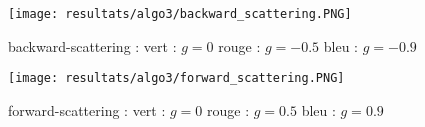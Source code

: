 \begin{figure}[h!]
\centering
\texttt{[image: resultats/algo3/backward\_scattering.PNG]}
\caption{backward-scattering : \qquad
vert : $g = 0$ \qquad
rouge : $g = -0.5$ \qquad
bleu : $g = -0.9$}
\end{figure}

\begin{figure}[h!]
\centering
\texttt{[image: resultats/algo3/forward\_scattering.PNG]}
\caption{forward-scattering : \qquad
vert : $g = 0$ \qquad
rouge : $g = 0.5$ \qquad
bleu : $g = 0.9$}
\end{figure}